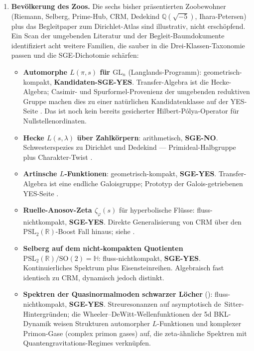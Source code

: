 \documentclass[11pt]{article}
\theoremstyle{definition}
\theoremstyle{remark}
\newcommand{\PSL}{\mathrm{PSL}}
\begin{document}
\begin{enumerate}
\item \textbf{Bevölkerung des Zoos.} Die sechs bisher präsentierten Zoobewohner
  (Riemann, Selberg, Prime-Hub, CRM, Dedekind
  $\mathbb{Q}(\sqrt{-5})$, Ihara-Petersen) plus das Begleitpaper zum Dirichlet-Atlas
  \cite{DirichletAtlas} sind illustrativ, nicht erschöpfend.
  Ein Scan der umgebenden Literatur und der Begleit-Baumdokumente
  \cite{CandidatesMasterList} identifiziert acht weitere
  Familien, die sauber in die Drei-Klassen-Taxonomie passen und die
  SGE-Dichotomie schärfen:
  \begin{itemize}
  \item \textbf{Automorphe $L(\pi, s)$ für $\mathrm{GL}_n$}
  (Langlands-Programm): geometrisch-kompakt, \textbf{Kandidaten-SGE-YES}.
  Transfer-Algebra ist die Hecke-Algebra; Casimir- und
  Spurformel-Provenienz der umgebenden reduktiven Gruppe machen dies zu einer
  natürlichen Kandidatenklasse auf der YES-Seite
  \cite{Langlands1970,CogdellPS1994}. Das ist noch kein bereits
  gesicherter Hilbert-P\'olya-Operator für Nullstellenordinaten.
  \item \textbf{Hecke $L(s, \lambda)$ über Zahlkörpern}:
  arithmetisch, \textbf{SGE-NO}. Schwesterspezies zu Dirichlet und
  Dedekind --- Primideal-Halbgruppe plus Charakter-Twist
  \cite{IwaniecKowalski}.
  \item \textbf{Artinsche $L$-Funktionen}: geometrisch-kompakt,
  \textbf{SGE-YES}. Transfer-Algebra ist eine endliche Galoisgruppe;
  Prototyp der Galois-getriebenen YES-Seite
  \cite{Artin1931,Chebotarev1926}.
  \item \textbf{Ruelle-Anosov-Zeta $\zeta_\varphi(s)$} für hyperbolische
  Flüsse: fluss-nichtkompakt, \textbf{SGE-YES}. Direkte Generalisierung
  von CRM über den $\PSL_2(\mathbb{R})$-Boost Fall hinaus; siehe
  \cite{DyatlovZworski2016,DyatlovZworski2019}.
  \item \textbf{Selberg auf dem nicht-kompakten Quotienten}
  $\mathrm{PSL}_2(\mathbb{R})/\mathrm{SO}(2) = \mathbb{H}$:
  fluss-nichtkompakt, \textbf{SGE-YES}. Kontinuierliches Spektrum plus
  Eisensteinreihen. Algebraisch fast identisch zu CRM,
  dynamisch jedoch distinkt.
  \item \textbf{Spektren der Quasinormalmoden schwarzer Löcher}
  (\cite{DeClerckHartnollYang2025}): fluss-nichtkompakt,
  \textbf{SGE-YES}. Streuresonanzen auf asymptotisch
  de~Sitter-Hintergründen; die Wheeler--DeWitt-Wellenfunktionen der 5d
  BKL-Dynamik weisen Strukturen automorpher $L$-Funktionen und
  komplexer Primon-Gase (complex primon gases) auf, die zeta-ähnliche Spektren mit Quantengravitations-Regimes verknüpfen.

\end{itemize}
\end{enumerate}
\end{document}
